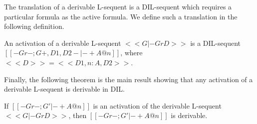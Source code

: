 The translation of a derivable L-sequent is a DIL-sequent which
requires a particular formula as the active formula.  We define
such a translation in the following definition.
\begin{definition}
  \label{def:focusing}
  An activation of a derivable L-sequent $<<G |- Gr D>>$ is a DIL-sequent
  $[[-Gr-;{G}+,{D1,D2}- |- +{A}@n]]$, where $<<D>> = <<D1,n : A,D2>>$.
\end{definition}
Finally, the following theorem is the main result showing that any
activation of a derivable L-sequent is derivable in DIL.
\begin{thm}
  \label{thm:completeness}
  If $[[-Gr- ; G' |- + A @ n]]$ is an activation of the derivable L-sequent 
  $<<G |- Gr D>>$, then $[[-Gr- ; G' |- + A @ n]]$ is derivable.
\end{thm}
